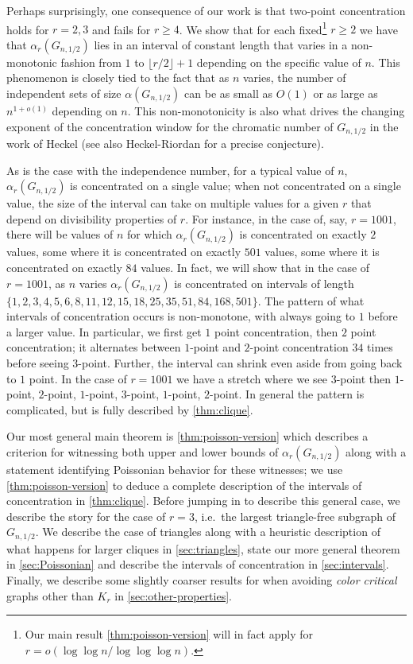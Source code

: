 \documentclass[11pt]{article}
\theoremstyle{definition}
\theoremstyle{remark}
\begin{document}
Perhaps surprisingly, one consequence of our work is that two-point concentration holds for $r = 2,3$ and fails for $r \geq 4$.  We show that for each fixed\footnote{Our main result  \cref{thm:poisson-version} will in fact apply for $r =  o(\log \log n/\log\log\log n)$.} $r \geq 2$ we have that $\alpha_r(G_{n,1/2})$ lies in an interval of constant length that varies in a non-monotonic fashion from $1$ to $\lfloor r/2\rfloor + 1$ depending on the specific value of $n$. This phenomenon is closely tied to the fact that as $n$ varies, the number of independent sets of size $\alpha(G_{n,1/2})$ can be as small as $O(1)$ or as large as $n^{1 + o(1)}$ depending on $n$.  This non-monotonicity is also what drives the changing exponent of the concentration window for the chromatic number of $G_{n,1/2}$ in the work of Heckel \cite{heckel2021non} (see also Heckel-Riordan \cite{heckel2023does} for a precise conjecture).

As is the case with the independence number, for a typical value of $n$, $\alpha_r(G_{n,1/2})$ is concentrated on a single value; when not concentrated on a single value, the size of the interval can take on multiple values for a given $r$ that depend on divisibility properties  of $r$. 
For instance, in the case of, say, $r = 1001$, there will be values of $n$ for which $\alpha_r(G_{n,1/2})$ is concentrated on exactly $2$ values, some where it is concentrated on exactly $501$ values, some where it is concentrated on exactly $84$ values.  In fact, we will show that in the case of $r = 1001$, as $n$ varies $\alpha_r(G_{n,1/2})$ is concentrated on intervals of length $\{1, 2, 3, 4, 5, 6, 8, 11, 12, 15, 18, 25, 35, 51, 84, 168, 501\}$.  The pattern of what intervals of concentration occurs is non-monotone, with always going to $1$ before a larger value.  In particular, we first get $1$ point concentration, then $2$ point concentration; it alternates between $1$-point and $2$-point concentration $34$ times before seeing $3$-point.  Further, the interval can shrink even aside from going back to $1$ point.  In the case of $r =1001$ we have a stretch where we see $3$-point then $1$-point, $2$-point, $1$-point, $3$-point, $1$-point, $2$-point. In general the pattern is complicated, but is fully described by \cref{thm:clique}. 


Our most general main theorem is \cref{thm:poisson-version} which describes a criterion for witnessing both upper and lower bounds of $\alpha_r(G_{n,1/2})$ along with a statement identifying Poissonian behavior for these witnesses; we use \cref{thm:poisson-version} to deduce a complete description of the intervals of concentration in \cref{thm:clique}.  Before jumping in to describe this general case, we describe the story for the case of $r = 3$, i.e.\ the largest triangle-free subgraph of $G_{n,1/2}$.  We describe the case of triangles along with a heuristic description of what happens for larger cliques in \cref{sec:triangles}, state our more general theorem in \cref{sec:Poissonian} and describe the intervals of concentration in \cref{sec:intervals}.  Finally, we describe some slightly coarser results for when avoiding \emph{color critical} graphs other than $K_r$ in \cref{sec:other-properties}. 
\end{document}
